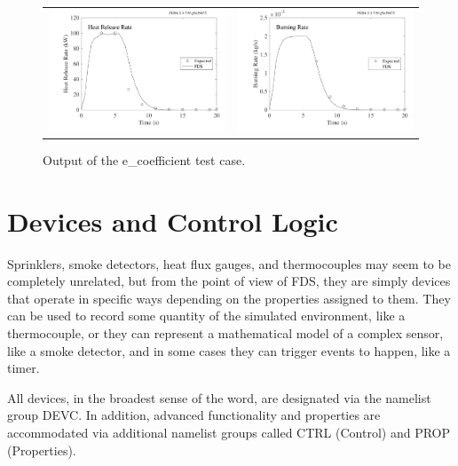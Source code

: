 \documentclass[11pt]{book}
\begin{document}
\begin{figure}[ht]
\begin{tabular*}{\textwidth}{lr}
\includegraphics[width=3.2in]{SCRIPT_FIGURES/e_coefficient_q} &
\includegraphics[width=3.2in]{SCRIPT_FIGURES/e_coefficient_br}
\end{tabular*}
\caption[Results of the {\ct e\_coefficient} test case]{Output of the  {\ct e\_coefficient} test case.}
\label{e_coef_fig}
\end{figure}







\chapter{Devices and Control Logic}

Sprinklers, smoke detectors, heat flux gauges, and thermocouples may seem to be completely unrelated, but from the point of view of FDS, they are simply devices that operate in specific ways depending on the properties assigned to them. They can be used to record some quantity of the simulated environment, like a thermocouple, or they can represent a mathematical model of a complex sensor, like a smoke detector, and in some cases they can trigger events to happen, like a timer.

All devices, in the broadest sense of the word, are designated via the namelist group {\ct DEVC}. In addition, advanced functionality and properties are accommodated via additional namelist groups called {\ct CTRL} (Control) and {\ct PROP} (Properties).
\end{document}
